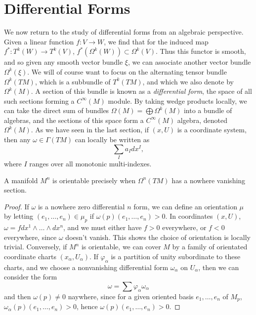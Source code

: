\section{Differential Forms}

We now return to the study of differential forms from an algebraic perspective. Given a linear function $f: V \to W$, we find that for the induced map $f^*: T^k(W) \to T^k(V)$, $f^*(\Omega^k(W)) \subset \Omega^k(V)$. Thus this functor is smooth, and so given any smooth vector bundle $\xi$, we can associate another vector bundle $\Omega^k(\xi)$. We will of course want to focus on the alternating tensor bundle $\Omega^k(TM)$, which is a subbundle of $T^k(TM)$, and which we also denote by $\Omega^k(M)$. A section of this bundle is known as a \emph{differential form}, the space of all such sections forming a $C^\infty(M)$ module. By taking wedge products locally, we can take the direct sum of bundles $\Omega(M) = \bigoplus \Omega^k(M)$ into a bundle of algebras, and the sections of this space form a $C^\infty(M)$ algebra, denoted $\Omega^k(M)$. As we have seen in the last section, if $(x,U)$ is a coordinate system, then any $\omega \in \Gamma(TM)$ can locally be written as
%
\[ \sum_I a_I dx^I, \]
%
where $I$ ranges over all monotonic multi-indexes.

\begin{theorem}
    A manifold $M^n$ is orientable precisely when $\Omega^n(TM)$ has a nowhere vanishing section.
\end{theorem}
\begin{proof}
    If $\omega$ is a nowhere zero differential $n$ form, we can define an orientation $\mu$ by letting $(e_1, \dots, e_n) \in \mu_p$ if $\omega(p)(e_1, \dots, e_n) > 0$. In coordinates $(x,U)$, $\omega = f dx^1 \wedge \dots \wedge dx^n$, and we must either have $f > 0$ everywhere, or $f < 0$ everywhere, since $\omega$ doesn't vanish. This shows the choice of orientation is locally trivial. Conversely, if $M^n$ is orientable, we can cover $M$ by a family of orientated coordinate charts $(x_\alpha, U_\alpha)$. If $\varphi_\alpha$ is a partition of unity subordinate to these charts, and we choose a nonvanishing differential form $\omega_\alpha$ on $U_\alpha$, then we can consider the form
    \[ \omega = \sum \varphi_\alpha \omega_\alpha \]
    and then $\omega(p) \neq 0$ naywhere, since for a given oriented basis $e_1, \dots, e_n$ of $M_p$, $\omega_\alpha(p)(e_1, \dots, e_n) > 0$, hence $\omega(p)(e_1, \dots, e_n) > 0$.
\end{proof}

